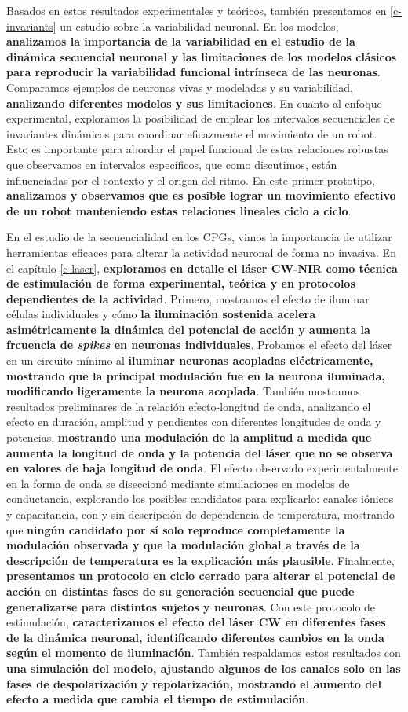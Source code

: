Basados en estos resultados experimentales y teóricos, también presentamos en \ref{c-invariants} un estudio sobre la variabilidad neuronal. En los modelos, \textbf{analizamos la importancia de la variabilidad en el estudio de la dinámica secuencial neuronal y las limitaciones de los modelos clásicos para reproducir la variabilidad funcional intrínseca de las neuronas}. Comparamos ejemplos de neuronas vivas y modeladas y su variabilidad, \textbf{analizando diferentes modelos y sus limitaciones}. En cuanto al enfoque experimental, exploramos la posibilidad de emplear los intervalos secuenciales de invariantes dinámicos para coordinar eficazmente el movimiento de un robot. Esto es importante para abordar el papel funcional de estas relaciones robustas que observamos en intervalos específicos, que como discutimos, están influenciadas por el contexto y el origen del ritmo. En este primer prototipo, \textbf{analizamos y observamos que es posible lograr un movimiento efectivo de un robot manteniendo estas relaciones lineales ciclo a ciclo}.

En el estudio de la secuencialidad en los CPGs, vimos la importancia de utilizar herramientas eficaces para alterar la actividad neuronal de forma no invasiva. En el capítulo \ref{c-laser}, \textbf{exploramos en detalle el láser CW-NIR como técnica de estimulación de forma experimental, teórica y en protocolos dependientes de la actividad}. Primero, mostramos el efecto de iluminar células individuales y cómo \textbf{la iluminación sostenida acelera asimétricamente la dinámica del potencial de acción y aumenta la frcuencia de  \textit{spikes} en neuronas individuales}. Probamos el efecto del láser en un circuito mínimo al \textbf{iluminar neuronas acopladas eléctricamente, mostrando que la principal modulación fue en la neurona iluminada, modificando ligeramente la neurona acoplada}. También mostramos resultados preliminares de la relación efecto-longitud de onda, analizando el efecto en duración, amplitud y pendientes con diferentes longitudes de onda y potencias, \textbf{mostrando una modulación de la amplitud a medida que aumenta la longitud de onda y la potencia del láser que no se observa en valores de baja longitud de onda}. El efecto observado experimentalmente en la forma de onda se diseccionó mediante simulaciones en modelos de conductancia, explorando los posibles candidatos para explicarlo: canales iónicos y capacitancia, con y sin descripción de dependencia de temperatura, mostrando que \textbf{ningún candidato por sí solo reproduce completamente la modulación observada y que la modulación global a través de la descripción de temperatura es la explicación más plausible}. Finalmente, \textbf{presentamos un protocolo en ciclo cerrado para alterar el potencial de acción en distintas fases de su generación secuencial que puede generalizarse para distintos sujetos y neuronas}. Con este protocolo de estimulación, \textbf{caracterizamos el efecto del láser CW en diferentes fases de la dinámica neuronal, identificando diferentes cambios en la onda según el momento de iluminación}. También respaldamos estos resultados con \textbf{una simulación del modelo, ajustando algunos de los canales solo en las fases de despolarización y repolarización, mostrando el aumento del efecto a medida que cambia el tiempo de estimulación}.

